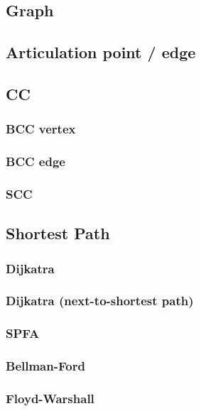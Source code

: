 \documentclass[10pt,oneside]{article}
\begin{document}
\begin{landscape}
\begin{multicols}{2}

\section{Graph}

\subsection{Articulation point / edge}

\subsection{CC}

\subsubsection{BCC vertex}

\subsubsection{BCC edge}

\subsubsection{SCC}

\subsection{Shortest Path}

\subsubsection{Dijkatra}

\subsubsection{Dijkatra (next-to-shortest path)}

\subsubsection{SPFA}

\subsubsection{Bellman-Ford}

\subsubsection{Floyd-Warshall}


\end{multicols}
\end{landscape}
\end{document}
